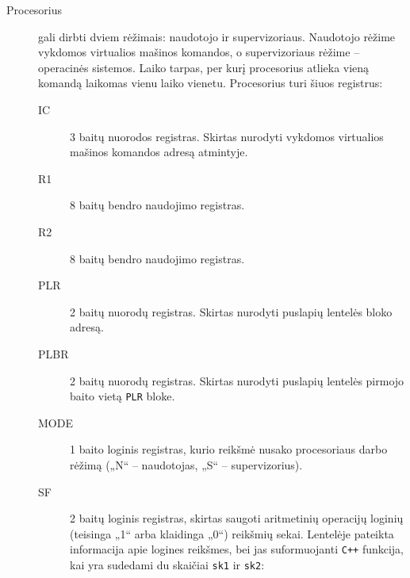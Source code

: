 \begin{description}
  \item[Procesorius] gali dirbti dviem rėžimais: naudotojo ir 
    supervizoriaus. Naudotojo rėžime vykdomos virtualios mašinos komandos,
    o supervizoriaus rėžime – operacinės sistemos. Laiko tarpas, per
    kurį procesorius atlieka vieną komandą laikomas vienu laiko vienetu.
    Procesorius turi šiuos registrus:
    \begin{description}
      \item[IC] 3 baitų nuorodos registras. Skirtas nurodyti vykdomos 
        virtualios mašinos komandos adresą atmintyje.
      \item[R1] 8 baitų bendro naudojimo registras.
      \item[R2] 8 baitų bendro naudojimo registras.
      \item[PLR] 2 baitų nuorodų registras. Skirtas nurodyti puslapių 
        lentelės bloko adresą.
      \item[PLBR] 2 baitų nuorodų registras. Skirtas nurodyti puslapių 
        lentelės pirmojo baito vietą \verb|PLR| bloke.
      \item[MODE] 1 baito loginis registras, kurio reikšmė nusako 
        procesoriaus darbo rėžimą („N“ – naudotojas, „S“ – supervizorius).
      \item[SF] 2 baitų loginis registras, skirtas saugoti aritmetinių 
        operacijų loginių (teisinga „1“ arba klaidinga „0“) reikšmių sekai. 
        Lentelėje pateikta informacija apie logines reikšmes, bei jas 
        suformuojanti \verb|C++| funkcija, kai yra sudedami du skaičiai 
        \verb|sk1| ir \verb|sk2|:


\end{description}
\end{description}
